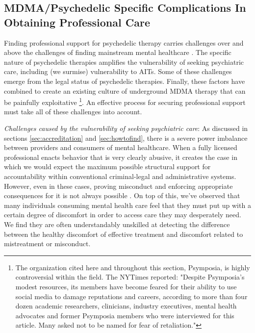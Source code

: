 \documentclass[12pt,letterpaper]{book}
\begin{document}
\subsection*{MDMA/Psychedelic Specific Complications In Obtaining Professional Care}
\label{sec:mdmaTherapistComplications}

Finding professional support for psychedelic therapy carries challenges over and above the challenges of finding mainstream mental healthcare \cite{studyingHarms,patientVulnerability}. The specific nature of psychedelic therapies amplifies the vulnerability of seeking psychiatric care, including (we surmise) vulnerability to AITs. Some of these challenges emerge from the legal status of psychedelic therapies. Finally, these factors have combined to create an existing culture of underground MDMA therapy that can be painfully exploitative \cite{powerTrip} \footnote{The organization cited here and throughout this section, Psymposia, is highly controversial within the field. The NYTimes reported: "Despite Psymposia's modest resources, its members have become feared for their ability to use social media to damage reputations and careers, according to more than four dozen academic researchers, clinicians, industry executives, mental health advocates and former Psymposia members who were interviewed for this article. Many asked not to be named for fear of retaliation."\cite{psymposiaFear}}. An effective process for securing professional support must take all of these challenges into account.

\textit{Challenges caused by the vulnerability of seeking psychiatric care}: As discussed in sections \ref{sec:accreditation} and \ref{sec:howtofind}, there is a severe power imbalance between providers and consumers of mental healthcare. When a fully licensed professional enacts behavior that is very clearly abusive, it creates the case in which we would expect the maximum possible structural support for accountability within conventional criminal-legal and administrative systems. However, even in these cases, proving misconduct and enforcing appropriate consequences for it is not always possible \cite{biaggio1998obstacles}. On top of this, we've observed that many individuals consuming mental health care feel that they must put up with a certain degree of discomfort in order to access care they may desperately need. We find they are often understandably unskilled at detecting the difference between the healthy discomfort of effective treatment \cite{eckerUnlocking} and discomfort related to mistreatment or misconduct. 
\end{document}
